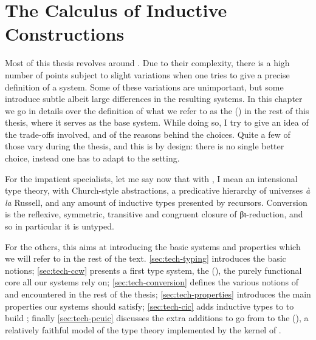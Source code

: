 \chapter{The Calculus of Inductive Constructions}
\label{chap:tech-intro}

\margintoc

Most of this thesis revolves around .
Due to their complexity, there is a high number of
points subject to slight variations
when one tries to give a precise definition of a system.
Some of these variations are unimportant, but some introduce subtle albeit large differences
in the resulting systems. In this chapter we go in details over
the definition of what we refer to as the
 () in the rest of this
thesis, where it serves as the base system.
While doing so, I try to give an idea of the trade-offs involved, and of the reasons
behind the choices. Quite a few of those vary during the thesis,
and this is by design: there is no single better choice,
instead one has to adapt to the setting.

For the impatient specialists, let me say now that with , I
mean an intensional type theory, with Church-style abstractions,
a predicative hierarchy of universes%
\textit{à la} Russell, and any amount of inductive types presented by recursors.
Conversion is the reflexive, symmetric, transitive and congruent
closure of βι-reduction, and so in particular it is untyped.

For the others, this  aims at introducing the basic
systems and properties which we will refer to in the rest of the text.
\cref{sec:tech-typing} introduces the basic notions;
\cref{sec:tech-ccw} presents a first type system,
the  (),
the purely functional core all our systems rely on;
\cref{sec:tech-conversion} defines the various notions of  and
 encountered in the rest of the thesis;
\cref{sec:tech-properties} introduces the main properties our systems should satisfy;
\cref{sec:tech-cic} adds inductive types to  to build
; finally \cref{sec:tech-pcuic} discusses the extra additions to go from
 to the 
(), a relatively faithful model of the type theory implemented by the
kernel of .


